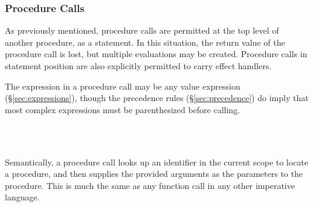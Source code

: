\subsubsection{Procedure Calls}
\label{sec:prose-procedure-call}

As previously mentioned, procedure calls are permitted at the top level of
another procedure, as a statement. In this situation, the return value of
the procedure call is lost, but multiple evaluations may be created. Procedure
calls in statement position are also explicitly permitted to carry effect handlers.

The expression in a procedure call may be any value expression (\S\ref{sec:expressions}),
though the precedence rules (\S\ref{sec:precedence}) do imply that most complex expressions
must be parenthesized before calling.

\begin{bnf*}
     \\
     \\
\end{bnf*}

Semantically, a procedure call looks up an identifier in the current scope to
locate a procedure, and then supplies the provided arguments as the parameters
to the procedure. This is much the same as any function call in any other
imperative language.

\begin{prooftree}
\end{prooftree}
